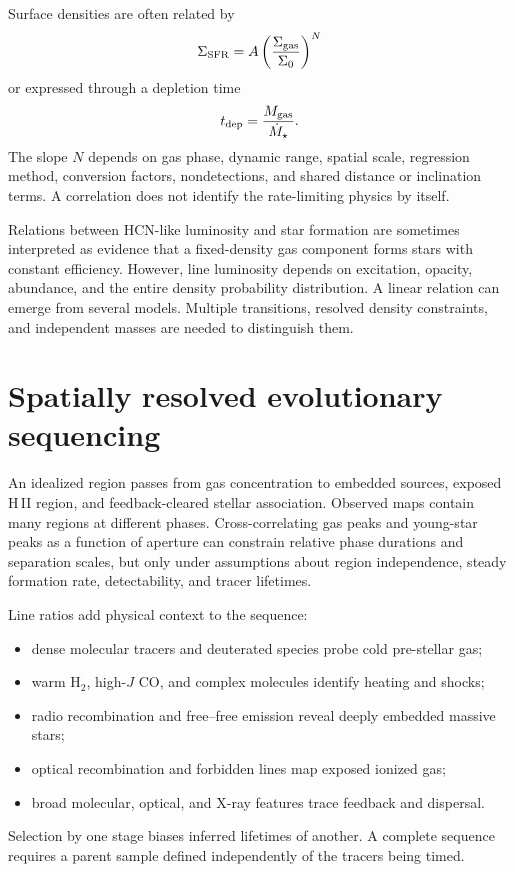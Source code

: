Surface densities are often related by
\begin{equation}
 \Sigma_{\rm SFR}=A\left(\frac{\Sigma_{\rm gas}}{
 \Sigma_0}\right)^N
 \label{eq:kennicutt-schmidt}
\end{equation}
or expressed through a depletion time
\begin{equation}
 t_{\rm dep}=\frac{M_{\rm gas}}{\dot M_\star}.
 \label{eq:depletion-time}
\end{equation}
The slope $N$ depends on gas phase, dynamic range, spatial scale, regression method,
conversion factors, nondetections, and shared distance or inclination terms.  A
correlation does not identify the rate-limiting physics by itself.

Relations between HCN-like luminosity and star formation are sometimes interpreted as
evidence that a fixed-density gas component forms stars with constant efficiency.
However, line luminosity depends on excitation, opacity, abundance, and the entire
density probability distribution.  A linear relation can emerge from several models.
Multiple transitions, resolved density constraints, and independent masses are needed
to distinguish them.

\section{Spatially resolved evolutionary sequencing}

An idealized region passes from gas concentration to embedded sources, exposed H\,II
region, and feedback-cleared stellar association.  Observed maps contain many regions
at different phases.  Cross-correlating gas peaks and young-star peaks as a function
of aperture can constrain relative phase durations and separation scales, but only
under assumptions about region independence, steady formation rate, detectability,
and tracer lifetimes.

Line ratios add physical context to the sequence:
\begin{itemize}
 \item dense molecular tracers and deuterated species probe cold pre-stellar gas;
 \item warm H$_2$, high-$J$ CO, and complex molecules identify heating and shocks;
 \item radio recombination and free--free emission reveal deeply embedded massive
stars;
 \item optical recombination and forbidden lines map exposed ionized gas;
 \item broad molecular, optical, and X-ray features trace feedback and dispersal.
\end{itemize}
Selection by one stage biases inferred lifetimes of another.  A complete sequence
requires a parent sample defined independently of the tracers being timed.

